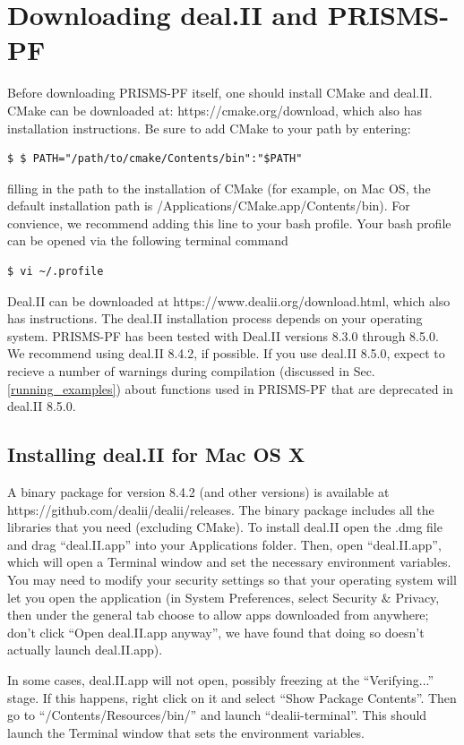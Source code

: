 \documentclass[10pt]{article} %
\begin{document}
\section{Downloading deal.II and PRISMS-PF}

Before downloading PRISMS-PF itself, one should install CMake and deal.II. CMake can be downloaded at: https://cmake.org/download, which also has installation instructions. Be sure to add CMake to your path by entering:
\begin{lstlisting}
$ $ PATH="/path/to/cmake/Contents/bin":"$PATH"
\end{lstlisting}
filling in the path to the installation of CMake (for example, on Mac OS, the default installation path is /Applications/CMake.app/Contents/bin). For convience, we recommend adding this line to your bash profile. Your bash profile can be opened via the following terminal command
\begin{lstlisting}
$ vi ~/.profile
\end{lstlisting}

Deal.II can be downloaded at https://www.dealii.org/download.html, which also has instructions. The deal.II installation process depends on your operating system. PRISMS-PF has been tested with Deal.II versions 8.3.0 through 8.5.0. We recommend using deal.II 8.4.2, if possible. If you use deal.II 8.5.0, expect to recieve a number of warnings during compilation (discussed in Sec. \ref{running_examples}) about functions used in PRISMS-PF that are deprecated in deal.II 8.5.0.

\subsection{Installing deal.II for Mac OS X}
A binary package for version 8.4.2 (and other versions) is available at https://github.com/dealii/dealii/releases. The binary package includes all the libraries that you need (excluding CMake). To install deal.II open the .dmg file and drag ``deal.II.app'' into your Applications folder. Then, open ``deal.II.app'', which will open a Terminal window and set the necessary environment variables. You may need to modify your security settings so that your operating system will let you open the application (in System Preferences, select Security $\&$ Privacy, then under the general tab choose to allow apps downloaded from anywhere; don't click ``Open deal.II.app anyway'', we have found that doing so doesn't actually launch deal.II.app). 

In some cases, deal.II.app will not open, possibly freezing at the ``Verifying...'' stage. If this happens, right click on it and select ``Show Package Contents''. Then go to ``/Contents/Resources/bin/'' and launch ``dealii-terminal''. This should launch the Terminal window that sets the environment variables.
\end{document}
